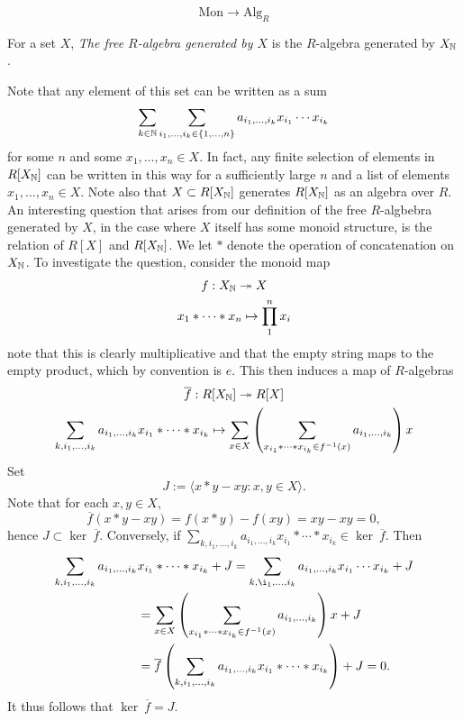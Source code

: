 $$
    \mathrm{Mon} \rightarrow \mathrm{Alg}_R
$$
\begin{definition}
    For a set $X$, \emph{The free $R$-algebra generated by $X$} is the $R$-algebra generated by $X_{\mathbb{N}}$. 
\end{definition}
Note that any element of this set can be written as a sum 
$$
    \sum_{k\in \mathbb{N}}\sum_{i_1,\dots,i_k\in \{1,\dots,n\}} a_{i_1,\dots,i_k} x_{i_1}\cdots x_{i_k}
$$
for some $n$ and some $x_1,\dots,x_n\in X$. In fact, any finite selection of elements in $R[X_{\mathbb{N}}]$ can be written in this way for a sufficiently large $n$ and a list of elements $x_1,\dots,x_n\in X$. Note also that $X\subset R[X_{\mathbb{N}}]$ generates $R[X_{\mathbb{N}}]$ as an algebra over $R$.\\
An interesting question that arises from our definition of the free $R$-algbebra generated by $X$, in the case where $X$ itself has some monoid structure, is the relation of $R[X]$ and $R[X_{\mathbb{N}}]$. We let $\ast$ denote the operation of concatenation on $X_{\mathbb{N}}$. To investigate the question, consider the monoid map
\begin{gather*}
    f : X_{\mathbb{N}} \twoheadrightarrow X\\
    x_1\ast \cdots \ast x_n \mapsto \prod_{1}^n x_i
\end{gather*} 
note that this is clearly multiplicative and that the empty string maps to the empty product, which by convention is $e$. This then induces a map of $R$-algebras
\begin{gather*}
    \overline{f} : R[X_{\mathbb{N}}] \twoheadrightarrow R[X]\\
    \sum_{k,i_1,\dots,i_k} a_{i_1,\dots,i_k} x_{i_1}\ast\cdots\ast x_{i_k} \mapsto \sum_{x\in X} \left(\sum_{ x_{i_1}\ast\cdots\ast x_{i_k}\in f^{-1}(x)} a_{i_1,\dots,i_k} \right) x 
\end{gather*}
Set 
$$
    J := \langle x\ast y - xy : x,y\in X \rangle.
$$
Note that for each $x,y\in X$, 
$$
    \overline{f}(x\ast y-xy) = f(x\ast y)-f(xy) = xy-xy = 0, 
$$
hence $J\subset \ker \ \overline{f}$. Conversely, if $\sum_{k,i_1,\dots,i_k} a_{i_1,\dots,i_k} x_{i_1}\ast \cdots \ast x_{i_k}\in \ker \ \overline{f}$. Then 
\begin{align*}
    \sum_{k,i_1,\dots,i_k} a_{i_1,\dots,i_k} &x_{i_1}\ast \cdots \ast x_{i_k} + J = \sum_{k,\i_1,\dots,i_k} a_{i_1,\dots,i_k}x_{i_1}\cdots x_{i_k} + J\\ &= \sum_{x\in X} \left( \sum_{x_{i_1}\ast \cdots \ast x_{i_k}\in f^{-1}(x)}a_{i_1,\dots,i_k} \right) x +J\\ 
    &= \overline{f}\left(\sum_{k,i_1,\dots,i_k} a_{i_1,\dots,i_k}x_{i_1}\ast\cdots \ast x_{i_k} \right) + J = 0.  
\end{align*}
It thus follows that $\ker\ \overline{f} = J$. 
